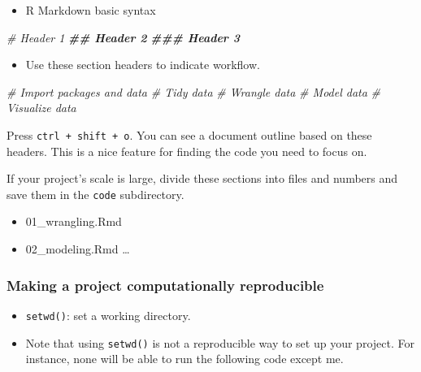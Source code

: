 \documentclass[
]{book}
\newenvironment{Shaded}{\begin{snugshade}}{\end{snugshade}}
\newcommand{\CommentTok}[1]{\textcolor[rgb]{0.56,0.35,0.01}{\textit{#1}}}
\newcommand{\DocumentationTok}[1]{\textcolor[rgb]{0.56,0.35,0.01}{\textbf{\textit{#1}}}}
\providecommand{\tightlist}{%
  \setlength{\itemsep}{0pt}\setlength{\parskip}{0pt}}
\begin{document}
\begin{itemize}
\tightlist
\item
  R Markdown basic syntax
\end{itemize}

\begin{Shaded}
\begin{Highlighting}[]
\CommentTok{\# Header 1}
\DocumentationTok{\#\# Header 2}
\DocumentationTok{\#\#\# Header 3}
\end{Highlighting}
\end{Shaded}

\begin{itemize}
\tightlist
\item
  Use these section headers to indicate workflow.
\end{itemize}

\begin{Shaded}
\begin{Highlighting}[]
\CommentTok{\# Import packages and data}
\CommentTok{\# Tidy data}
\CommentTok{\# Wrangle data}
\CommentTok{\# Model data}
\CommentTok{\# Visualize data}
\end{Highlighting}
\end{Shaded}

Press \texttt{ctrl\ +\ shift\ +\ o}. You can see a document outline based on these headers. This is a nice feature for finding the code you need to focus on.

If your project's scale is large, divide these sections into files and numbers and save them in the \texttt{code} subdirectory.

\begin{itemize}
\tightlist
\item
  01\_wrangling.Rmd
\item
  02\_modeling.Rmd
  \ldots{}
\end{itemize}

\subsubsection{Making a project computationally reproducible}\label{making-a-project-computationally-reproducible}

\begin{itemize}
\item
  \texttt{setwd()}: set a working directory.
\item
  Note that using \texttt{setwd()} is not a reproducible way to set up your project. For instance, none will be able to run the following code except me.
\end{itemize}
\end{document}
